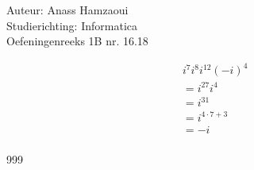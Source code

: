 \documentclass[a4paper]{article}
\begin{document}
  
\noindent \large Auteur: Anass Hamzaoui \\
\noindent \large Studierichting: Informatica \\
\noindent \large Oefeningenreeks 1B nr. 16.18 \\

\medskip

\normalsize

\begin{eqnarray*}
    && i^7 i^8 i^{12} (-i)^4 \\
    && = i^{27} i^4 \\
    && = i^{31} \\
    && = i^{4 \cdot 7 + 3} \\
    && = -i \\
\end{eqnarray*}

\begin{thebibliography}{999}
\end{thebibliography}
\end{document}
